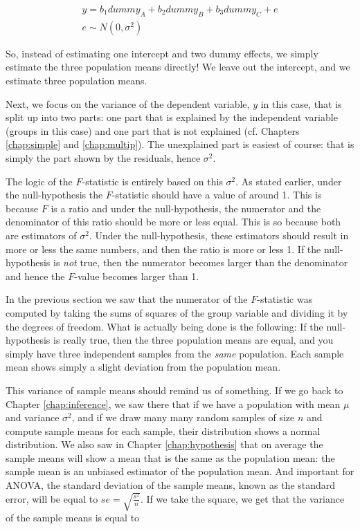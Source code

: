 \documentclass[]{book}\usepackage[]{graphicx}\usepackage[]{color}
\begin{document}
\begin{eqnarray}
y = b_1 dummy_A + b_2 dummy_B + b_3 dummy_C + e\\
e \sim N(0, \sigma^2)
\end{eqnarray}


So, instead of estimating one intercept and two dummy effects, we simply estimate the three population means directly! We leave out the intercept, and we estimate three population means. 

Next, we focus on the variance of the dependent variable, $y$ in this case, that is split up into two parts: one part that is explained by the independent variable (groups in this case) and one part that is not explained (cf. Chapters \ref{chap:simple} and \ref{chap:multip}). The unexplained part is easiest of course: that is simply the part shown by the residuals, hence $\sigma^2$. 

The logic of the $F$-statistic is entirely based on this $\sigma^2$. As stated earlier, under the null-hypothesis the $F$-statistic should have a value of around 1. This is because $F$ is a ratio and under the null-hypothesis, the numerator and the denominator of this ratio should be more or less equal. This is so because both are estimators of $\sigma^2$. Under the null-hypothesis, these estimators should result in more or less the same numbers, and then the ratio is more or less 1. If the null-hypothesis is \textit{not} true, then the numerator becomes larger than the denominator and hence the $F$-value becomes larger than 1. 

In the previous section we saw that the numerator of the $F$-statistic was computed by taking the sums of squares of the group variable and dividing it by the degrees of freedom. What is actually being done is the following: If the null-hypothesis is really true, then the three population means are equal, and you simply have three independent samples from the \textit{same} population. Each sample mean shows simply a slight deviation from the population mean. 

This variance of sample means should remind us of something. If we go back to Chapter \ref{chap:inference}, we saw there that if we have a population with mean $\mu$ and variance $\sigma^2$, and if we draw many many random samples of size $n$ and compute sample means for each sample, their distribution shows a normal distribution. We also saw in Chapter \ref{chap:hypothesis} that on average the sample means will show a mean that is the same as the population mean: the sample mean is an unbiased estimator of the population mean. And important for ANOVA, the standard deviation of the sample means, known as the standard error, will be equal to $se = \sqrt{\frac{s^2}{n}}$. If we take the square, we get that the variance of the sample means is equal to
\end{document}
